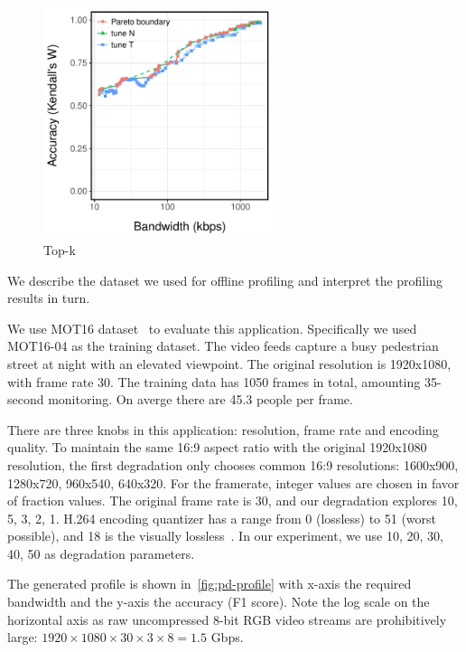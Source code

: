 \begin{figure}
  \centering
  \includegraphics[width=0.6\textwidth]{figures/log-profile.pdf}
  \caption{Top-k}
  \label{fig:tk-profile}
\end{figure}

We describe the dataset we used for offline profiling and interpret the
profiling results in turn.

 We use MOT16 dataset~\cite{milan2016mot16} to
evaluate this application. Specifically we used MOT16-04 as the training
dataset. The video feeds capture a busy pedestrian street at night with an
elevated viewpoint. The original resolution is 1920x1080, with frame rate
30. The training data has 1050 frames in total, amounting 35-second monitoring.
On averge there are 45.3 people per frame.

There are three knobs in this application: resolution, frame rate and encoding
quality. To maintain the same 16:9 aspect ratio with the original 1920x1080
resolution, the first degradation only chooses common 16:9 resolutions:
1600x900, 1280x720, 960x540, 640x320. For the framerate, integer values are
chosen in favor of fraction values. The original frame rate is 30, and our
degradation explores 10, 5, 3, 2, 1. H.264 encoding quantizer has a range from 0
(lossless) to 51 (worst possible), and 18 is the visually
lossless~\cite{bellard2012ffmpeg}. In our experiment, we use 10, 20, 30, 40, 50
as degradation parameters.

The generated profile is shown in~\autoref{fig:pd-profile} with x-axis the
required bandwidth and the y-axis the accuracy (F1 score). Note the log scale on
the horizontal axis as raw uncompressed 8-bit RGB video streams are
prohibitively large: $1920 \times 1080 \times 30 \times 3 \times 8 = 1.5 $ Gbps.

